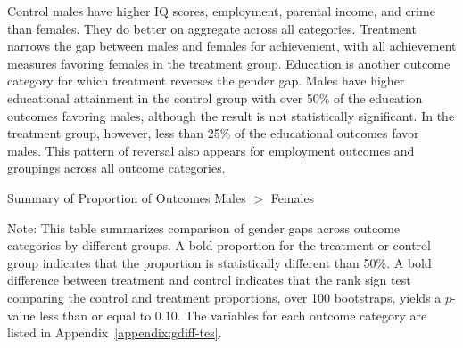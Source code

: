 Control males have higher IQ scores, employment, parental income, and crime than females. They do better on aggregate across all categories. Treatment narrows the gap between males and females for achievement, with all achievement measures favoring females in the treatment group. Education is another outcome category for which treatment reverses the gender gap. Males have higher educational attainment in the control group with over 50\% of the education outcomes favoring males, although the result is not statistically significant. In the treatment group, however, less than 25\% of the educational outcomes favor males. This pattern of reversal also appears for employment outcomes and groupings across all outcome categories.

\begin{table}[H]
\centering
\caption{Summary of Proportion of Outcomes Males $>$ Females}
\label{tab:proportion-table-ranksign}
\begin{threeparttable}

\begin{tablenotes}
\footnotesize
\item Note: This table summarizes comparison of gender gaps across outcome categories by different groups. A bold proportion for the treatment or control group indicates that the proportion is statistically different than 50\%. A bold difference between treatment and control indicates that the rank sign test comparing the control and treatment proportions, over 100 bootstraps, yields a $p$-value less than or equal to 0.10. The variables for each outcome category are listed in Appendix~\ref{appendix:gdiff-tes}.
\end{tablenotes}
\end{threeparttable}
\end{table}


